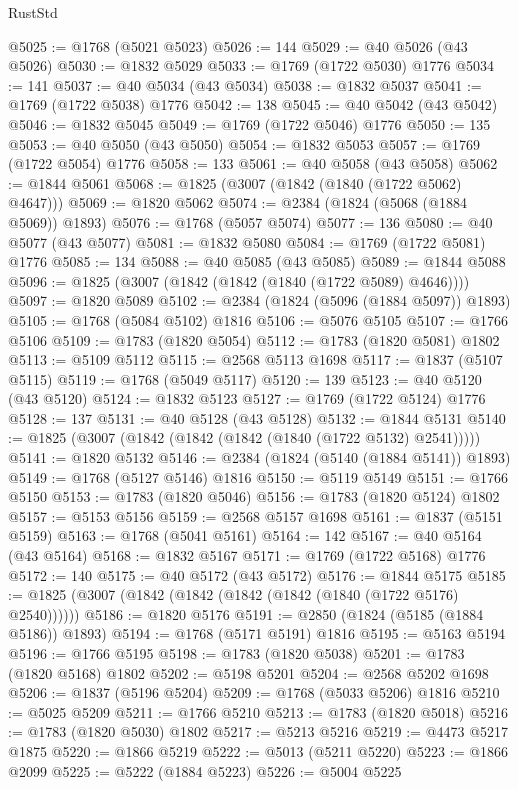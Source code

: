 \begin{lexlean}{RustStd}
\begin{coremodule}
@5025 := @1768 (@5021 @5023)
@5026 := 144
@5029 := @40 @5026 (@43 @5026)
@5030 := @1832 @5029
@5033 := @1769 (@1722 @5030) @1776
@5034 := 141
@5037 := @40 @5034 (@43 @5034)
@5038 := @1832 @5037
@5041 := @1769 (@1722 @5038) @1776
@5042 := 138
@5045 := @40 @5042 (@43 @5042)
@5046 := @1832 @5045
@5049 := @1769 (@1722 @5046) @1776
@5050 := 135
@5053 := @40 @5050 (@43 @5050)
@5054 := @1832 @5053
@5057 := @1769 (@1722 @5054) @1776
@5058 := 133
@5061 := @40 @5058 (@43 @5058)
@5062 := @1844 @5061
@5068 := @1825 (@3007 (@1842 (@1840 (@1722 @5062) @4647)))
@5069 := @1820 @5062
@5074 := @2384 (@1824 (@5068 (@1884 @5069)) @1893)
@5076 := @1768 (@5057 @5074)
@5077 := 136
@5080 := @40 @5077 (@43 @5077)
@5081 := @1832 @5080
@5084 := @1769 (@1722 @5081) @1776
@5085 := 134
@5088 := @40 @5085 (@43 @5085)
@5089 := @1844 @5088
@5096 := @1825 (@3007 (@1842 (@1842 (@1840 (@1722 @5089) @4646))))
@5097 := @1820 @5089
@5102 := @2384 (@1824 (@5096 (@1884 @5097)) @1893)
@5105 := @1768 (@5084 @5102) @1816
@5106 := @5076 @5105
@5107 := @1766 @5106
@5109 := @1783 (@1820 @5054)
@5112 := @1783 (@1820 @5081) @1802
@5113 := @5109 @5112
@5115 := @2568 @5113 @1698
@5117 := @1837 (@5107 @5115)
@5119 := @1768 (@5049 @5117)
@5120 := 139
@5123 := @40 @5120 (@43 @5120)
@5124 := @1832 @5123
@5127 := @1769 (@1722 @5124) @1776
@5128 := 137
@5131 := @40 @5128 (@43 @5128)
@5132 := @1844 @5131
@5140 := @1825 (@3007 (@1842 (@1842 (@1842 (@1840 (@1722 @5132) @2541)))))
@5141 := @1820 @5132
@5146 := @2384 (@1824 (@5140 (@1884 @5141)) @1893)
@5149 := @1768 (@5127 @5146) @1816
@5150 := @5119 @5149
@5151 := @1766 @5150
@5153 := @1783 (@1820 @5046)
@5156 := @1783 (@1820 @5124) @1802
@5157 := @5153 @5156
@5159 := @2568 @5157 @1698
@5161 := @1837 (@5151 @5159)
@5163 := @1768 (@5041 @5161)
@5164 := 142
@5167 := @40 @5164 (@43 @5164)
@5168 := @1832 @5167
@5171 := @1769 (@1722 @5168) @1776
@5172 := 140
@5175 := @40 @5172 (@43 @5172)
@5176 := @1844 @5175
@5185 := @1825 (@3007 (@1842 (@1842 (@1842 (@1842 (@1840 (@1722 @5176) @2540))))))
@5186 := @1820 @5176
@5191 := @2850 (@1824 (@5185 (@1884 @5186)) @1893)
@5194 := @1768 (@5171 @5191) @1816
@5195 := @5163 @5194
@5196 := @1766 @5195
@5198 := @1783 (@1820 @5038)
@5201 := @1783 (@1820 @5168) @1802
@5202 := @5198 @5201
@5204 := @2568 @5202 @1698
@5206 := @1837 (@5196 @5204)
@5209 := @1768 (@5033 @5206) @1816
@5210 := @5025 @5209
@5211 := @1766 @5210
@5213 := @1783 (@1820 @5018)
@5216 := @1783 (@1820 @5030) @1802
@5217 := @5213 @5216
@5219 := @4473 @5217 @1875
@5220 := @1866 @5219
@5222 := @5013 (@5211 @5220)
@5223 := @1866 @2099
@5225 := @5222 (@1884 @5223)
@5226 := @5004 @5225

\end{coremodule}
\end{lexlean}
